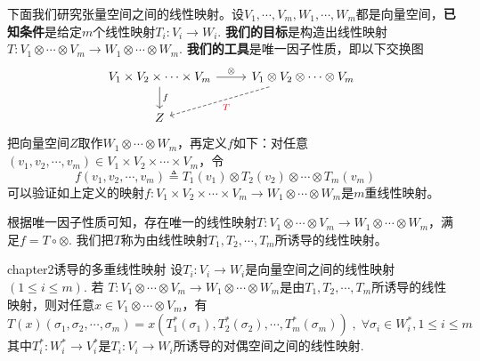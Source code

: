 下面我们研究张量空间之间的线性映射。设$V_{1},\cdots,V_{m},W_{1},\cdots,W_{m}$都是向量空间，\textbf{已知条件}是给定$m$个线性映射$T_{i}:V_{i}\longrightarrow W_{i}$. \textbf{我们的目标}是构造出线性映射$T:V_{1}\otimes\cdots\otimes V_{m}\longrightarrow W_{1}\otimes\cdots\otimes W_{m}$. \textbf{我们的工具}是唯一因子性质，即以下交换图
\[
\begin{tikzcd}
V_{1}\times V_{2}\times\cdots\times V_{m} \arrow[r, "\otimes"] \arrow[d, "f", left ] & V_{1}\otimes V_{2}\otimes\cdots\otimes V_{m} \arrow[dl,dashrightarrow, "{\color{red}T}"]\\
Z  &
\end{tikzcd} 
\]
把向量空间$Z$取作$W_{1}\otimes\cdots\otimes W_{m}$，再定义$f$如下：对任意$(v_{1},v_{2},\cdots,v_{m})\in V_{1}\times V_{2}\times\cdots\times V_{m}$，令
\[
f(v_{1},v_{2},\cdots,v_{m})\triangleq T_{1}(v_{1})\otimes T_{2}(v_{2})\otimes\cdots\otimes T_{m}(v_{m})\quad
\]
可以验证如上定义的映射$f:V_{1}\times V_{2}\times\cdots\times V_{m}\longrightarrow W_{1}\otimes\cdots\otimes W_{m}$是$m$重线性映射。

根据唯一因子性质可知，存在唯一的线性映射$T:V_{1}\otimes\cdots\otimes V_{m}\longrightarrow W_{1}\otimes\cdots\otimes W_{m}$，满足$f=T\circ\otimes$. 我们把$T$称为由线性映射$T_{1},T_{2},\cdots,T_{m}$所诱导的线性映射。

\begin{mythm}{}{chapter2诱导的多重线性映射}
	设$T_{i}:V_{i}\longrightarrow W_{i}$是向量空间之间的线性映射$(1\leqslant i\leqslant m)$. 若
	$T:V_{1}\otimes\cdots\otimes V_{m}\longrightarrow W_{1}\otimes\cdots\otimes W_{m}$是由$T_{1},T_{2},\cdots,T_{m}$所诱导的线性映射，则对任意$x\in V_{1}\otimes\cdots\otimes V_{m}$，有
	\[
	T(x)\left(\sigma_{1},\sigma_{2},\cdots,\sigma_{m} \right)=x\left(T^{\ast}_{1}(\sigma_{1}),T^{\ast}_{2}(\sigma_{2}),\cdots,T^{\ast}_{m}(\sigma_{m}) \right)\;,\;\forall \sigma_{i}\in W^{\ast}_{i},1\leqslant i\leqslant m
	\]
	其中$T_{i}^{\ast}:W^{\ast}_{i}\longrightarrow V^{\ast}_{i}$是$T_{i}:V_{i}\longrightarrow W_{i}$所诱导的对偶空间之间的线性映射. 
\end{mythm}

